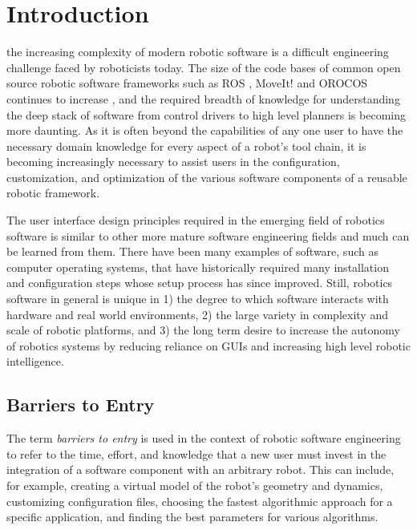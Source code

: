 \documentclass[10pt,journal,compsoc]{joser1}
\begin{document}
\section{Introduction}
 {the increasing complexity of modern robotic software is a difficult engineering challenge faced by roboticists today. The size of the code bases of common open source robotic software frameworks such as ROS \cite{quigley2009ros}, MoveIt! \cite{moveit} and OROCOS \cite{bruyninckx2001open} continues to increase \cite{makarenko2007benefits}, and the required breadth of knowledge for understanding the deep stack of software from control drivers to high level planners is becoming more daunting. As it is often beyond the capabilities of any one user to have the necessary domain knowledge for every aspect of a robot's tool chain, it is becoming increasingly necessary to assist users in the configuration, customization, and optimization of the various software components of a reusable robotic framework. 

The user interface design principles required in the emerging field of robotics software is similar to other more mature software engineering fields and much can be learned from them. There have been many examples of software, such as computer operating systems, that have historically required many installation and configuration steps whose setup process has since improved. Still, robotics software in general is unique in 1) the degree to which software interacts with hardware and real world environments, 2) the large variety in complexity and scale of robotic platforms, and 3) the long term desire to increase the autonomy of robotics systems by reducing reliance on GUIs and increasing high level robotic intelligence. 

\subsection{Barriers to Entry}

The term \textit{barriers to entry} is used in the context of robotic software engineering to refer to the time, effort, and knowledge that a new user must invest in the integration of a software component with an arbitrary robot. This can include, for example, creating a virtual model of the robot's geometry and dynamics, customizing configuration files, choosing the fastest algorithmic approach for a specific application, and finding the best parameters for various algorithms.

}
\end{document}
